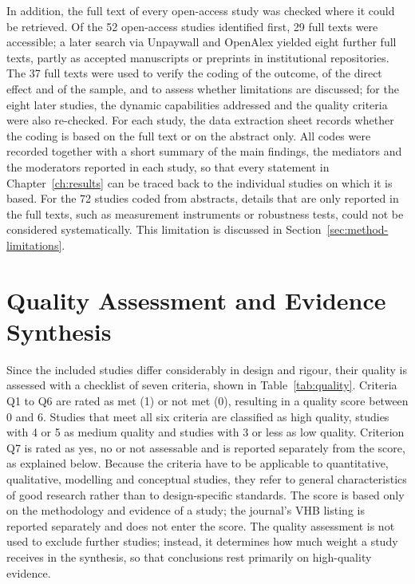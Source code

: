 In addition, the full text of every open-access study was checked where it could be retrieved. Of the 52 open-access studies identified first, 29 full texts were accessible; a later search via Unpaywall and OpenAlex yielded eight further full texts, partly as accepted manuscripts or preprints in institutional repositories. The 37 full texts were used to verify the coding of the outcome, of the direct effect and of the sample, and to assess whether limitations are discussed; for the eight later studies, the dynamic capabilities addressed and the quality criteria were also re-checked. For each study, the data extraction sheet records whether the coding is based on the full text or on the abstract only. All codes were recorded together with a short summary of the main findings, the mediators and the moderators reported in each study, so that every statement in Chapter~\ref{ch:results} can be traced back to the individual studies on which it is based. For the 72 studies coded from abstracts, details that are only reported in the full texts, such as measurement instruments or robustness tests, could not be considered systematically. This limitation is discussed in Section~\ref{sec:method-limitations}.

\section{Quality Assessment and Evidence Synthesis}
\label{sec:quality}

Since the included studies differ considerably in design and rigour, their quality is assessed with a checklist of seven criteria, shown in Table~\ref{tab:quality}. Criteria Q1 to Q6 are rated as met (1) or not met (0), resulting in a quality score between 0 and 6. Studies that meet all six criteria are classified as high quality, studies with 4 or 5 as medium quality and studies with 3 or less as low quality. Criterion Q7 is rated as yes, no or not assessable and is reported separately from the score, as explained below. Because the criteria have to be applicable to quantitative, qualitative, modelling and conceptual studies, they refer to general characteristics of good research rather than to design-specific standards. The score is based only on the methodology and evidence of a study; the journal's VHB listing is reported separately and does not enter the score. The quality assessment is not used to exclude further studies; instead, it determines how much weight a study receives in the synthesis, so that conclusions rest primarily on high-quality evidence.

